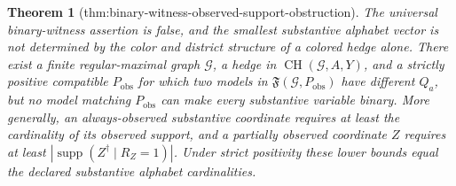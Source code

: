 \documentclass{article}
\newtheorem{theorem}{Theorem}
\begin{document}
\begin{theorem}[thm:binary-witness-observed-support-obstruction]\label{thm:binary-witness-observed-support-obstruction}
The universal binary-witness assertion is false, and the smallest substantive alphabet vector is not determined by the color and district structure of a colored hedge alone. There exist a finite regular-maximal graph \(\mathcal G\), a hedge in \(\operatorname{CH}(\mathcal G,A,Y)\), and a strictly positive compatible \(P_{\mathrm{obs}}\) for which two models in \(\mathfrak F(\mathcal G,P_{\mathrm{obs}})\) have different \(Q_a\), but no model matching \(P_{\mathrm{obs}}\) can make every substantive variable binary. More generally, an always-observed substantive coordinate requires at least the cardinality of its observed support, and a partially observed coordinate \(Z\) requires at least \(|\operatorname{supp}(Z^{\dagger}\mid R_Z=1)|\). Under strict positivity these lower bounds equal the declared substantive alphabet cardinalities.
\end{theorem}
\end{document}
